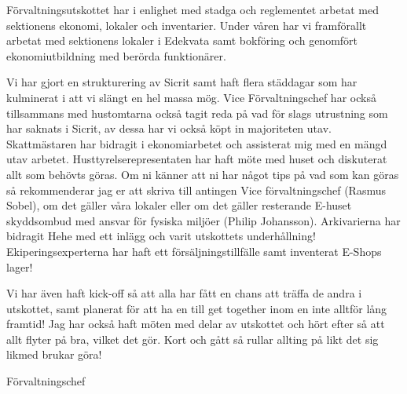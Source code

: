 \documentclass[../_main/handlingar.tex]{subfiles}
\begin{document}

Förvaltningsutskottet har i enlighet med stadga och reglementet arbetat med sektionens  ekonomi, lokaler och inventarier. Under våren har vi framförallt arbetat med sektionens lokaler i Edekvata samt bokföring och genomfört ekonomiutbildning med berörda funktionärer.

Vi har gjort en strukturering av Sicrit samt haft flera städdagar som har kulminerat i att vi slängt en hel massa mög. Vice Förvaltningschef har också tillsammans med hustomtarna också tagit reda på vad för slags utrustning som har saknats i Sicrit, av dessa har vi också köpt in majoriteten utav. 
Skattmästaren har bidragit i ekonomiarbetet och assisterat mig med en mängd utav arbetet.
Husttyrelserepresentaten har haft möte med huset och diskuterat allt som behövts göras. Om ni känner att ni har något tips på vad som kan göras så rekommenderar jag er att skriva till antingen Vice förvaltningschef (Rasmus Sobel), om det gäller våra lokaler eller om det gäller resterande E-huset skyddsombud med ansvar för fysiska miljöer (Philip Johansson).
Arkivarierna har bidragit Hehe med ett inlägg och varit utskottets underhållning!
Ekiperingsexperterna har haft ett försäljningstillfälle samt inventerat E-Shops lager!

Vi har även haft kick-off så att alla har fått en chans att träffa de andra i utskottet, samt planerat för att ha en till get together inom en inte alltför lång framtid! Jag har också haft möten med delar av utskottet och hört efter så att allt flyter på bra, vilket det gör. Kort och gått så rullar allting på likt det sig likmed brukar göra!



\begin{signatures}{1}
    \mvh
    \signature{\fvc}{Förvaltningschef}
\end{signatures}
\end{document}
